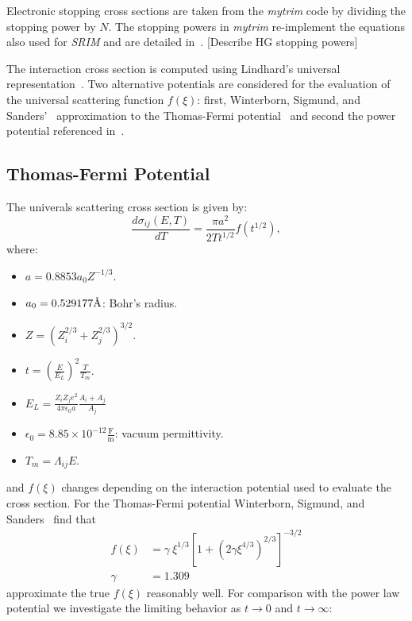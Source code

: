 \documentclass[review]{elsarticle}
\newcommand{\angstrom}{\text{\normalfont\AA}}
\begin{document}
Electronic stopping cross sections are taken from the \textit{mytrim} code by dividing the stopping power by $N$. The stopping powers in \textit{mytrim} re-implement the equations also used for \textit{SRIM} and are detailed in~\cite{SRIM}. [Describe HG stopping powers]

The interaction cross section is computed using Lindhard's universal representation~\cite{Lindhard1968}. Two alternative potentials are considered for the evaluation of the universal scattering function $f(\xi)$: first, Winterborn, Sigmund, and Sanders'~\cite{WSS} approximation to the Thomas-Fermi potential~\cite{Lindhard1968} and second the power potential referenced in~\cite{Huang1993}.

\subsection{Thomas-Fermi Potential}
The univerals scattering cross section is given by:
\begin{equation}\label{eq:universal_scattering_xs}
   \frac{d \sigma_{ij}(E,T)}{dT} = \frac{\pi a^2}{2 T t^{1/2}} f(t^{1/2}),
\end{equation}
where:
\begin{itemize}
  \item $a = 0.8853 a_0 Z^{-1/3}$.
  \item $a_0=0.529177 \angstrom$: Bohr's radius.
  \item $Z =  (Z_i^{2/3} + Z_j^{2/3})^{3/2}$.
  \item $t = \left( \frac{E}{E_L} \right)^2 \frac{T}{T_m}$.
  \item $E_L = \frac{Z_i Z_j e^2}{4 \pi \epsilon_0 a} \frac{A_i + A_j}{A_j}$
  \item $\epsilon_0=8.85 \times10^{-12} \frac{\text{F}}{\text{m}}$: vacuum permittivity.
  \item $T_m = \Lambda_{ij} E$.
\end{itemize}
and $f(\xi)$ changes depending on the interaction potential used to evaluate the cross section. For the Thomas-Fermi potential Winterborn, Sigmund, and Sanders~\cite{WSS} find that
\begin{align}\label{eq:WSS}
  f(\xi) &= \gamma ~\xi^{1/3} \left[ 1 + \left( 2 \gamma \xi^{4/3} \right)^{2/3}\right]^{-3/2} \nonumber \\
  \gamma &= 1.309
\end{align}
approximate the true $f(\xi)$ reasonably well. For comparison with the power law potential we investigate the limiting behavior as $t \rightarrow 0$ and $t \rightarrow \infty$:
\end{document}
